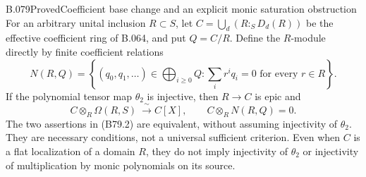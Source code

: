 \begin{saresult}{B.079}{Proved}{Coefficient base change and an explicit monic saturation obstruction}
For an arbitrary unital inclusion $R\subset S$, let
$C=\bigcup_d(R:_S D_d(R))$ be the effective coefficient ring of B.064,
and put $Q=C/R$. Define the $R$-module directly by finite coefficient
relations
\[
 N(R,Q)=\left\{(q_0,q_1,\ldots)\in\bigoplus_{i\ge0}Q:
             \sum_i r^i q_i=0\text{ for every }r\in R\right\}.
                                                        \tag{B79.1}
\]
If the polynomial tensor map $\theta_2$ is injective, then $R\to C$
is epic and
\[
 C\otimes_R\Omega(R,S)\ \xrightarrow{\ \sim\ } C[X],
 \qquad C\otimes_RN(R,Q)=0.                              \tag{B79.2}
\]
The two assertions in (B79.2) are equivalent, without assuming
injectivity of $\theta_2$. They are necessary conditions, not a
universal sufficient criterion. Even when $C$ is a flat localization
of a domain $R$, they do not imply injectivity of $\theta_2$ or
injectivity of multiplication by monic polynomials on its source.
\end{saresult}
